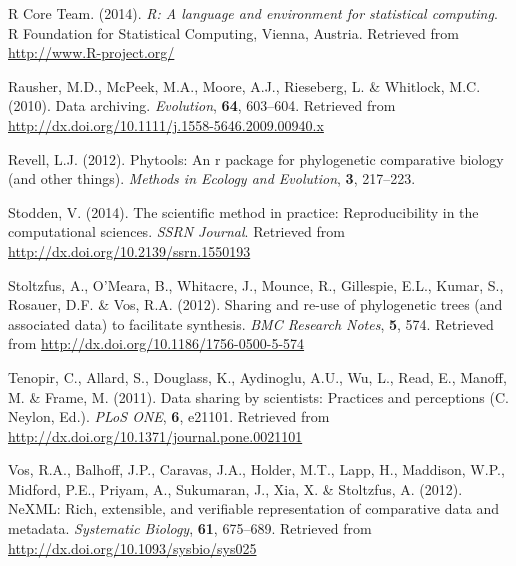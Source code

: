 \documentclass[author-year, review, 11pt]{elsarticle} %
\begin{document}
R Core Team. (2014). \emph{R: A language and environment for statistical
computing}. R Foundation for Statistical Computing, Vienna, Austria.
Retrieved from \url{http://www.R-project.org/}

Rausher, M.D., McPeek, M.A., Moore, A.J., Rieseberg, L. \& Whitlock,
M.C. (2010). Data archiving. \emph{Evolution}, \textbf{64}, 603--604.
Retrieved from \url{http://dx.doi.org/10.1111/j.1558-5646.2009.00940.x}

Revell, L.J. (2012). Phytools: An r package for phylogenetic comparative
biology (and other things). \emph{Methods in Ecology and Evolution},
\textbf{3}, 217--223.

Stodden, V. (2014). The scientific method in practice: Reproducibility
in the computational sciences. \emph{SSRN Journal}. Retrieved from
\url{http://dx.doi.org/10.2139/ssrn.1550193}

Stoltzfus, A., O'Meara, B., Whitacre, J., Mounce, R., Gillespie, E.L.,
Kumar, S., Rosauer, D.F. \& Vos, R.A. (2012). Sharing and re-use of
phylogenetic trees (and associated data) to facilitate synthesis.
\emph{BMC Research Notes}, \textbf{5}, 574. Retrieved from
\url{http://dx.doi.org/10.1186/1756-0500-5-574}

Tenopir, C., Allard, S., Douglass, K., Aydinoglu, A.U., Wu, L., Read,
E., Manoff, M. \& Frame, M. (2011). Data sharing by scientists:
Practices and perceptions (C. Neylon, Ed.). \emph{PLoS ONE}, \textbf{6},
e21101. Retrieved from
\url{http://dx.doi.org/10.1371/journal.pone.0021101}

Vos, R.A., Balhoff, J.P., Caravas, J.A., Holder, M.T., Lapp, H.,
Maddison, W.P., Midford, P.E., Priyam, A., Sukumaran, J., Xia, X. \&
Stoltzfus, A. (2012). NeXML: Rich, extensible, and verifiable
representation of comparative data and metadata. \emph{Systematic
Biology}, \textbf{61}, 675--689. Retrieved from
\url{http://dx.doi.org/10.1093/sysbio/sys025}
\end{document}
